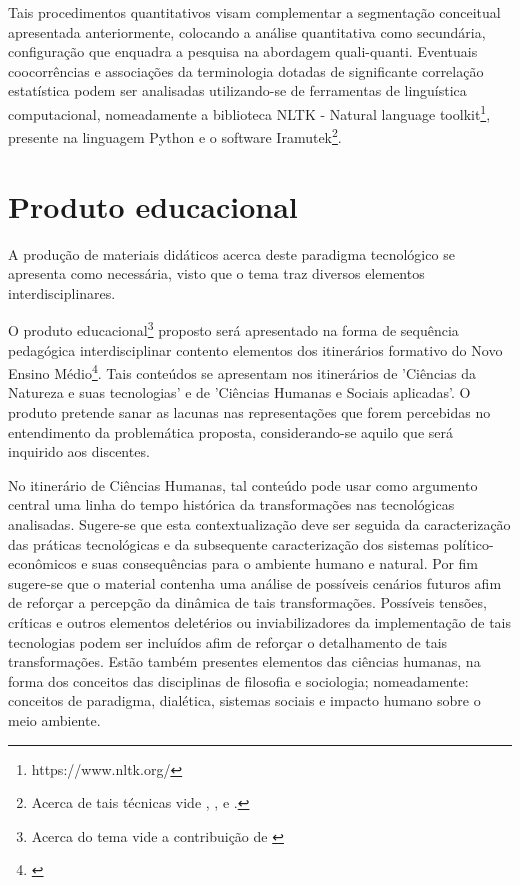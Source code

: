 \documentclass[
   article,       %
   12pt,          %
   oneside,       %
   a4paper,       %
   english,       %
   brazil,           %
   sumario=tradicional
   ]{abntex2}
\begin{document}
Tais procedimentos quantitativos visam complementar a segmentação conceitual apresentada anteriormente, colocando a análise quantitativa como secundária, configuração que enquadra a pesquisa na abordagem quali-quanti. Eventuais coocorrências e associações da terminologia dotadas de significante correlação estatística podem ser analisadas utilizando-se de ferramentas de linguística computacional, nomeadamente a biblioteca NLTK - Natural language toolkit\footnote{https://www.nltk.org/}, presente na linguagem Python e o software Iramutek\footnote{Acerca de tais técnicas vide \cite{IRAMUTEQ_analise}, \cite{Gestao_Informacao}, \cite{IRAMUTEQ_TUTORIAL} e \cite{lexical_frequencies}.}.


\section{Produto educacional}

A produção de materiais didáticos acerca deste paradigma tecnológico se apresenta como necessária, visto que o tema traz diversos elementos interdisciplinares.

O produto educacional\footnote{Acerca do tema vide a contribuição de \cite{PRODUTOS_EDUCACIONAIS}} proposto será apresentado na forma de sequência pedagógica interdisciplinar contento elementos dos itinerários formativo do Novo Ensino Médio\footnote{\cite{Itinirarios_nem}}. Tais conteúdos se apresentam nos itinerários de 'Ciências da Natureza e suas tecnologias' e de 'Ciências Humanas e Sociais aplicadas'. O produto pretende sanar as lacunas nas representações que forem percebidas no entendimento da problemática proposta, considerando-se aquilo que será inquirido aos discentes.

No itinerário de Ciências Humanas, tal conteúdo pode usar como argumento central uma linha do tempo histórica da transformações nas tecnológicas analisadas. Sugere-se que esta contextualização deve ser seguida da caracterização das práticas tecnológicas e da subsequente caracterização dos sistemas político-econômicos e suas consequências para o ambiente humano e natural. Por fim sugere-se que o material contenha uma análise de possíveis cenários futuros afim de reforçar a percepção da dinâmica de tais transformações. Possíveis tensões, críticas e outros elementos deletérios ou inviabilizadores da implementação de tais tecnologias podem ser incluídos afim de reforçar o detalhamento de tais transformações. Estão também presentes elementos das ciências humanas, na forma dos conceitos das disciplinas de filosofia e sociologia; nomeadamente: conceitos de paradigma, dialética, sistemas sociais e impacto humano sobre o meio ambiente.
\end{document}
